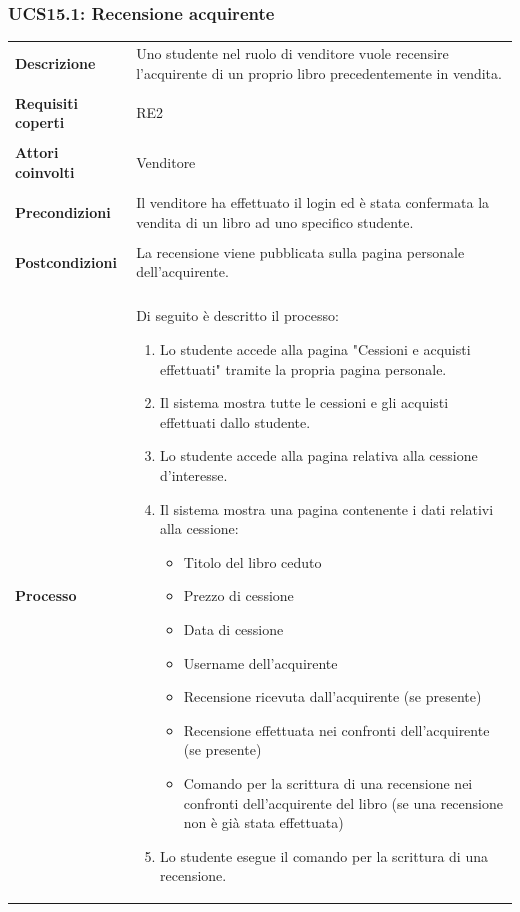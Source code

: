 \documentclass[10pt,a4paper]{report}
\begin{document}
	\subsubsection{UCS15.1: Recensione acquirente}
	\begin{tabular}{lp{}}
		\textbf{Descrizione}&Uno studente nel ruolo di venditore vuole recensire l'acquirente di un proprio libro precedentemente in vendita.\\
		\\
		\textbf{Requisiti coperti}&RE2\\
		\\
		\textbf{Attori coinvolti}&Venditore\\
		\\
		\textbf{Precondizioni}&Il venditore ha effettuato il login ed è stata confermata la vendita di un libro ad uno specifico studente.\\
		\\
		\textbf{Postcondizioni}&La recensione viene pubblicata sulla pagina personale dell'acquirente.\\
		\\
		\textbf{Processo}&Di seguito è descritto il processo:
		\begin{enumerate}
			\item Lo studente accede alla pagina "Cessioni e acquisti effettuati" tramite la propria pagina personale.
			\item Il sistema mostra tutte le cessioni e gli acquisti effettuati dallo studente.
			\item Lo studente accede alla pagina relativa alla cessione d'interesse.
			\item Il sistema mostra una pagina contenente i dati relativi alla cessione:
			\begin{itemize}
				\item Titolo del libro ceduto
				\item Prezzo di cessione
				\item Data di cessione
				\item Username dell'acquirente
				\item Recensione ricevuta dall'acquirente (se presente)
				\item Recensione effettuata nei confronti dell'acquirente (se presente)
				\item Comando per la scrittura di una recensione nei confronti dell'acquirente del libro (se una recensione non è già stata effettuata)
			\end{itemize}
			\item Lo studente esegue il comando per la scrittura di una recensione.

\end{enumerate}
\end{tabular}
\end{document}
